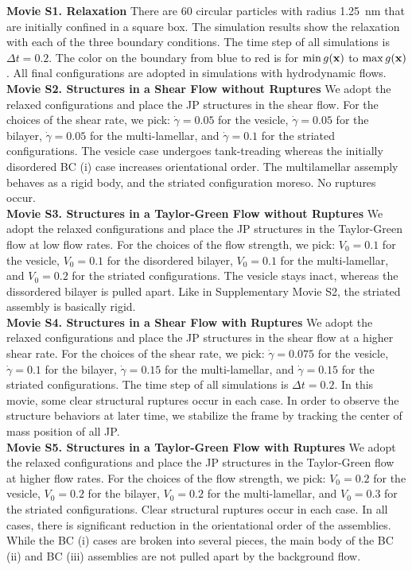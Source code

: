\noindent
{\bf Movie S1. Relaxation} 
There are 60 circular particles with radius 1.25~nm that are initially
confined in a square box. The simulation results show the relaxation
with each of the three boundary conditions. The time step of all
simulations is $\Delta t=0.2$. The color on the boundary from blue to
red is for $\min g(\mathbf{x})$ to $\max g(\mathbf{x})$. All final configurations are
adopted in simulations with hydrodynamic flows. \\


\noindent
{\bf Movie S2. Structures in a Shear Flow without Ruptures} 
We adopt the relaxed configurations and place the JP structures in the
shear flow. For the choices of the shear rate, we pick: $\dot\gamma =
0.05$ for the vesicle, $\dot\gamma = 0.05$ for the bilayer, $\dot\gamma
= 0.05$ for the multi-lamellar, and $\dot\gamma = 0.1$ for the striated
configurations. The vesicle case undergoes tank-treading whereas the
initially disordered BC (i) case increases orientational order. The
multilamellar assemply behaves as a rigid body, and the striated
configuration moreso. No ruptures occur. \\



\noindent
{\bf Movie S3. Structures in a Taylor-Green Flow without Ruptures} 
We adopt the relaxed configurations and place the JP structures in the
Taylor-Green flow at low flow rates. For the choices of the flow
strength, we pick: $V_0 = 0.1$ for the vesicle, $V_0 = 0.1$ for the
disordered bilayer, $V_0 = 0.1$ for the multi-lamellar, and $V_0 = 0.2$
for the striated configurations. The vesicle stays inact, whereas the
dissordered bilayer is pulled apart. Like in Supplementary Movie S2, the
striated assembly is basically rigid. \\


\noindent
{\bf Movie S4. Structures in a Shear Flow with Ruptures} 
We adopt the relaxed configurations and place the JP structures in the
shear flow at a higher shear rate. For the choices of the shear rate, we
pick: $\dot\gamma = 0.075$ for the vesicle, $\dot\gamma = 0.1$ for the
bilayer, $\dot\gamma = 0.15$ for the multi-lamellar, and $\dot\gamma =
0.15$ for the striated configurations. The time step of all simulations
is $\Delta t=0.2$. In this movie, some clear structural ruptures occur
in each case. In order to observe the structure behaviors at later time,
we stabilize the frame by tracking the center of mass position of all
JP. \\


\noindent
{\bf Movie S5. Structures in a Taylor-Green Flow with Ruptures} 
We adopt the relaxed configurations and place the JP structures in the
Taylor-Green flow at higher flow rates. For the choices of the flow
strength, we pick: $V_0 = 0.2$ for the vesicle, $V_0 = 0.2$ for the
bilayer, $V_0 = 0.2$ for the multi-lamellar, and $V_0 = 0.3$ for the
striated configurations. Clear structural ruptures occur in each case.
In all cases, there is significant reduction in the orientational order
of the assemblies. While the BC (i) cases are broken into several
pieces, the main body of the BC (ii) and BC (iii) assemblies are not
pulled apart by the background flow. 

